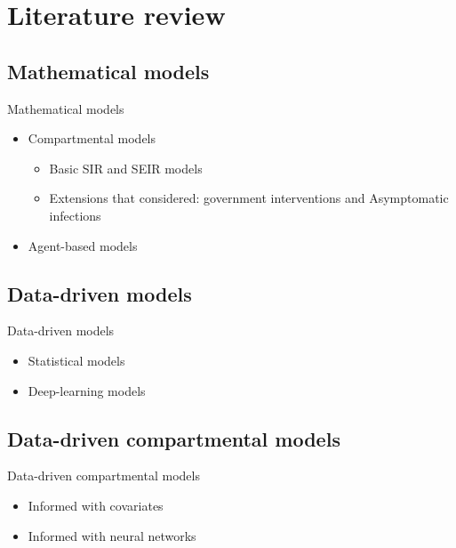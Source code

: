 \section{Literature review}

\subsection{Mathematical models}

\begin{frame}{Mathematical models}
\begin{itemize}
    \item Compartmental models
    \begin{itemize}
        \item Basic \gls{SIR} and \gls{SEIR} models \cite{kermackContributionMathematicalTheory1927, kermackContributionsMathematicalTheory1932, kermackContributionsMathematicalTheory1933}
        \item Extensions that considered: government interventions and Asymptomatic infections \cite{zhaoModelingEpidemicDynamics2020,heSEIRModelingCOVID192020,ndairouMathematicalModelingCOVID192020,bastosModelingForecastingEarly2020,sarkarModelingForecastingCOVID192020}
    \end{itemize}

    \item Agent-based models \cite{kerrCovasimAgentbasedModel2021,silvaCOVIDABSAgentbasedModel2020,hoertelStochasticAgentbasedModel2020}
\end{itemize}
\end{frame}

\subsection{Data-driven models}
\begin{frame}{Data-driven models}
\begin{itemize}
    \item Statistical models
    \item Deep-learning models
\end{itemize}
\end{frame}

\subsection{Data-driven compartmental models}

\begin{frame}{Data-driven compartmental models}
\begin{itemize}
    \item Informed with covariates

    \item Informed with neural networks
\end{itemize}
\end{frame}
